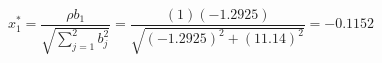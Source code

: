 

\[
x_{1}^{*} = \frac{\rho b_1}{\sqrt{\sum_{j=1}^{2}{b_{j}^2}}} = \frac{(1)(-1.2925)}{\sqrt{(-1.2925)^2 + (11.14)^2}} = -0.1152

\]



